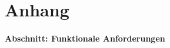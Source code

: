 \part*{Anhang}
\subsection*{Abschnitt: Funktionale Anforderungen}

\begin{table}[h!]
	\caption{Funktionale Anforderungen an die Projektsoftware}
	\label{tab:funkanf}
\end{table}
